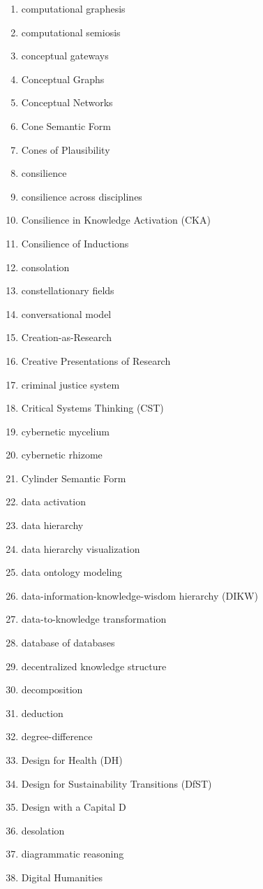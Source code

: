 \begin{multicols}{4}
\begin{enumerate}[label=\arabic*.]
\item computational graphesis
\item computational semiosis
\item conceptual gateways
\item Conceptual Graphs
\item Conceptual Networks
\item Cone Semantic Form
\item Cones of Plausibility
\item consilience
\item consilience across disciplines
\item Consilience in Knowledge Activation (CKA)
\item Consilience of Inductions
\item consolation
\item constellationary fields
\item conversational model
\item Creation-as-Research
\item Creative Presentations of Research
\item criminal justice system
\item Critical Systems Thinking (CST)
\item cybernetic mycelium
\item cybernetic rhizome
\item Cylinder Semantic Form
\item data activation
\item data hierarchy
\item data hierarchy visualization
\item data ontology modeling
\item data-information-knowledge-wisdom hierarchy (DIKW)
\item data-to-knowledge transformation
\item database of databases
\item decentralized knowledge structure
\item decomposition
\item deduction
\item degree-difference
\item Design for Health (DH)
\item Design for Sustainability Transitions (DfST)
\item Design with a Capital D
\item desolation
\item diagrammatic reasoning
\item Digital Humanities

\end{enumerate}
\end{multicols}
